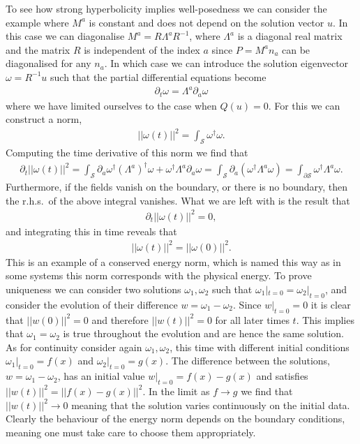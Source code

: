 \documentclass[10pt]{report}
\theoremstyle{definition}
\newcommand{\spasurf}[0]{\mathcal{S}}
\begin{document}
To see how strong hyperbolicity implies well-posedness we can consider the example where $M^a$ is constant and does not depend on the solution vector $u$. In this case we can diagonalise $M^a = R \Lambda^a R^{-1}$, where $\Lambda^a$ is a diagonal real matrix and the matrix $R$ is independent of the index $a$ since $P = M^a n_a$ can be diagonalised for any $n_a$. In which case we can introduce the solution eigenvector $\omega = R^{-1}u$ such that the partial differential equations become
\begin{align}
    \partial_t \omega = \Lambda^a \partial_a \omega
\end{align}
where we have limited ourselves to the case when $Q(u) = 0$. For this we can construct a norm,
\begin{align}
    ||\omega(t)||^2 = \int_\spasurf \omega^\dagger \omega.
\end{align}
Computing the time derivative of this norm we find that
\begin{align}
    \partial_t ||\omega(t)||^2 = \int_\spasurf \partial_a \omega^\dagger \left( \Lambda^a \right)^\dagger \omega + \omega^\dagger \Lambda^a \partial_a \omega = \int_\spasurf \partial_a \left( \omega^\dagger \Lambda^a \omega \right) = \int_{\partial \spasurf} \omega^\dagger \Lambda^a \omega.
\end{align}
Furthermore, if the fields vanish on the boundary, or there is no boundary, then the r.h.s.~of the above integral vanishes. What we are left with is the result that
\begin{align}
    \partial_t ||\omega(t)||^2 = 0,
\end{align}
and integrating this in time reveals that
\begin{align}
    ||\omega(t)||^2 = ||\omega(0)||^2.
\end{align}
This is an example of a conserved energy norm, which is named this way as in some systems this norm corresponds with the physical energy. To prove uniqueness we can consider two solutions $\omega_1, \omega_2$ such that $\omega_1|_{t=0} = \omega_2|_{t=0}$, and consider the evolution of their difference $w = \omega_1 - \omega_2$. Since $w|_{t=0} = 0$ it is clear that $||w(0)||^2 = 0$ and therefore $||w(t)||^2 = 0$ for all later times $t$. This implies that $\omega_1 = \omega_2$ is true throughout the evolution and are hence the same solution. As for continuity consider again $\omega_1, \omega_2$, this time with different initial conditions $\omega_1|_{t=0} = f(x)$ and $\omega_2|_{t=0} = g(x)$. The difference between the solutions, $w = \omega_1 - \omega_2$, has an initial value $w|_{t=0} = f(x) - g(x)$ and satisfies $||w(t)||^2 = ||f(x)-g(x)||^2$. In the limit as $f \rightarrow g$ we find that $||w(t)||^2 \rightarrow 0$ meaning that the solution varies continuously on the initial data. Clearly the behaviour of the energy norm depends on the boundary conditions, meaning one must take care to choose them appropriately.
\end{document}
